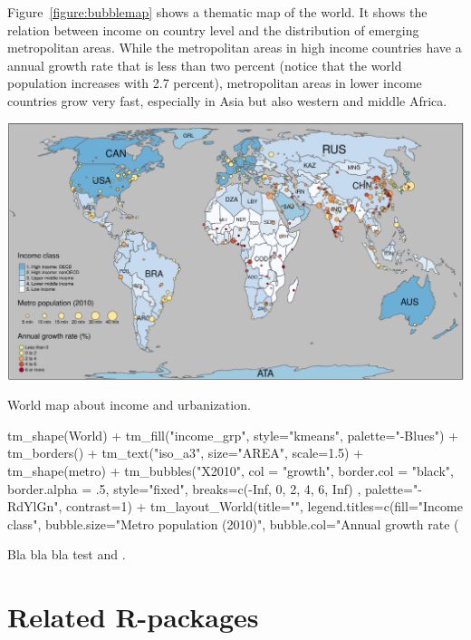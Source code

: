 Figure~\ref{figure:bubblemap} shows a thematic map of the world. It shows the relation between income on country level and the distribution of emerging metropolitan areas. While the metropolitan areas in high income countries have a annual growth rate that is less than two percent (notice that the world population increases with 2.7 percent), metropolitan areas in lower income countries grow very fast, especially in Asia but also western and middle Africa.

\begin{widefigure}[htbp]
  \centering
  \includegraphics{bubbleMap2}
  \caption{World map about income and urbanization.}
  \label{figure:bubblemap}
\end{widefigure}






\begin{example}
tm_shape(World) +
  tm_fill("income_grp", style="kmeans", palette="-Blues") +
  tm_borders() +
  tm_text("iso_a3", size="AREA", scale=1.5) +
tm_shape(metro) +
  tm_bubbles("X2010", col = "growth", border.col = "black", 
  border.alpha = .5, style="fixed", breaks=c(-Inf, 0, 2, 4, 6, Inf) ,
  palette="-RdYlGn", contrast=1) + 
tm_layout_World(title="", legend.titles=c(fill="Income class", 
  bubble.size="Metro population (2010)", bubble.col="Annual growth rate (%
\end{example}


Bla bla bla test \citet{tmap} and \citep{sp2}. 

\section{Related R-packages}


%

